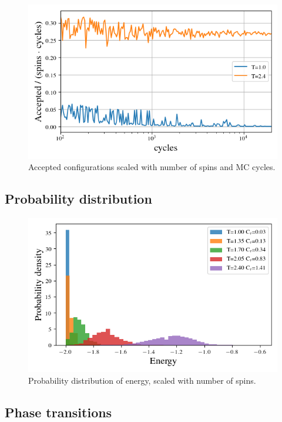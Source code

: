\begin{figure}[H]
  \centering
  \includegraphics[width=\textwidth]{../figures/accepted.png}
  \caption{Accepted configurations scaled with number of spins and MC cycles.}
  \label{fig:accepted}
\end{figure}


\subsection{Probability distribution}



\begin{figure}[H]
  \centering
  \includegraphics[width=\textwidth]{../figures/distribution.png}
  \caption{Probability distribution of energy, scaled with number of spins.}
  \label{fig:distribution}
\end{figure}




\subsection{Phase transitions}




